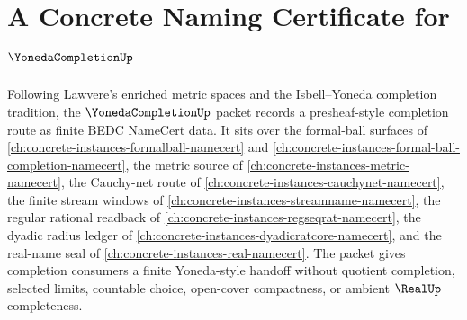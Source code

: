 \chapter{A Concrete Naming Certificate for $\YonedaCompletionUp$}
\label{ch:concrete-instances-yoneda-completion-namecert}

Following Lawvere's enriched metric spaces and the Isbell--Yoneda completion tradition, the $\YonedaCompletionUp$ packet records a presheaf-style completion route as finite BEDC NameCert data. It sits over the formal-ball surfaces of \autoref{ch:concrete-instances-formalball-namecert} and \autoref{ch:concrete-instances-formal-ball-completion-namecert}, the metric source of \autoref{ch:concrete-instances-metric-namecert}, the Cauchy-net route of \autoref{ch:concrete-instances-cauchynet-namecert}, the finite stream windows of \autoref{ch:concrete-instances-streamname-namecert}, the regular rational readback of \autoref{ch:concrete-instances-regseqrat-namecert}, the dyadic radius ledger of \autoref{ch:concrete-instances-dyadicratcore-namecert}, and the real-name seal of \autoref{ch:concrete-instances-real-namecert}. The packet gives completion consumers a finite Yoneda-style handoff without quotient completion, selected limits, countable choice, open-cover compactness, or ambient $\RealUp$ completeness.

